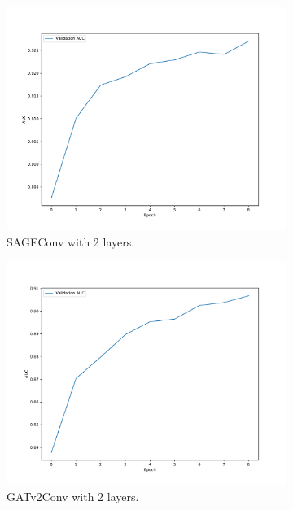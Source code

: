\documentclass[11pt]{article}
\begin{document}
\begin{figure}
\begin{subfigure}{0.49\textwidth}
    \includegraphics[width=\textwidth]{figures/charts/Sage/auc-layerType_SAGEConv-numLayers_2.pdf}
    \caption{SAGEConv with 2 layers.}
    \label{fig:sage2}
  \end{subfigure}
  \begin{subfigure}{0.49\textwidth}
    \centering
    \includegraphics[width=\textwidth]{figures/charts/GAT/auc-layerType_GATv2Conv-numLayers_2.pdf}
    \caption{GATv2Conv with 2 layers.}
    \label{fig:gat2}
  \end{subfigure}
  \begin{subfigure}{0.49\textwidth}
    \centering

\end{subfigure}
\end{figure}
\end{document}
